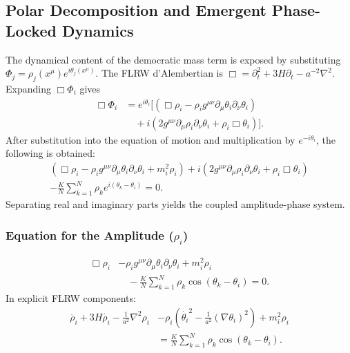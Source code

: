 \subsection{Polar Decomposition and Emergent Phase-Locked Dynamics}
\label{subsec:polar}

The dynamical content of the democratic mass term is exposed by substituting $\Phi_j=\rho_j(x^\mu)e^{i\theta_j(x^\mu)}$. The FLRW d'Alembertian is $\Box = \partial_t^2 + 3H\partial_t - a^{-2}\nabla^2$. Expanding $\Box\Phi_i$ gives
\begin{equation}
\begin{aligned}
\Box\Phi_i
&= e^{i\theta_i}\Big[(\Box\rho_i - \rho_i g^{\mu\nu}\partial_\mu\theta_i\partial_\nu\theta_i) \\
&\quad+ i(2g^{\mu\nu}\partial_\mu\rho_i\partial_\nu\theta_i + \rho_i\Box\theta_i)\Big] .
\end{aligned}
\end{equation}
After substitution into the equation of motion and multiplication by $e^{-i\theta_i}$, the following is obtained:
\begin{multline}
(\Box\rho_i - \rho_i g^{\mu\nu}\partial_\mu\theta_i\partial_\nu\theta_i + m_i^2\rho_i)
+ i(2g^{\mu\nu}\partial_\mu\rho_i\partial_\nu\theta_i + \rho_i\Box\theta_i) \\
- \frac{K}{N}\sum_{k=1}^N \rho_k e^{i(\theta_k-\theta_i)} = 0 .
\end{multline}
Separating real and imaginary parts yields the coupled amplitude-phase system.

\subsubsection*{Equation for the Amplitude ($\rho_i$)}
\begin{equation}
\begin{aligned}
\Box\rho_i &- \rho_i g^{\mu\nu}\partial_\mu\theta_i\partial_\nu\theta_i + m_i^2\rho_i \\
&\quad- \frac{K}{N}\sum_{k=1}^N\rho_k\cos(\theta_k-\theta_i) = 0 .
\end{aligned}
\end{equation}
In explicit FLRW components:
\begin{equation}
{
\begin{aligned}
\ddot{\rho_i} + 3H\dot{\rho_i} - \frac{1}{a^2}\nabla^2\rho_i
&- \rho_i\!\left(\dot{\theta_i}^2 - \frac{1}{a^2}(\nabla\theta_i)^2\right)
+ m_i^2\rho_i \\
&= \frac{K}{N}\sum_{k=1}^N\rho_k\cos(\theta_k-\theta_i) .
\end{aligned}
} \label{eq:14}
\end{equation}

